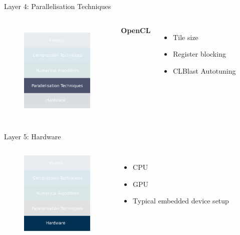 \documentclass{beamer}
\begin{document}
\begin{frame}{Layer 4: Parallelisation Techniques}

\begin{columns}


\begin{figure}
    \centering
    \includegraphics[width=3.5cm]{images/parallelisations.pdf}
    \label{fig:inference-stack-parallels-2}
\end{figure}


\textbf{OpenCL}
\begin{itemize}
    \item Tile size
    \item Register blocking 
    \item CLBlast Autotuning 
\end{itemize}

\end{columns}

\end{frame}



\begin{frame}{Layer 5: Hardware}

\begin{columns}


\begin{figure}
    \centering
    \includegraphics[width=3.5cm]{images/hardwares.pdf}
\end{figure}


\begin{itemize}
    \item CPU
    \item GPU
    \item Typical embedded device setup
\end{itemize}
\end{columns}


\end{frame}
\end{document}
